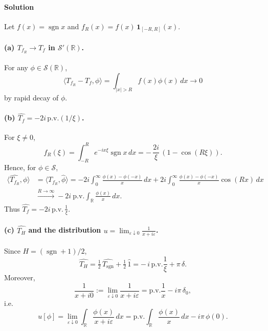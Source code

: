 \documentclass[12pt,a4paper]{article}
\theoremstyle{plain}
\theoremstyle{definition}
\theoremstyle{remark}
\theoremstyle{remark}
\begin{document}
\paragraph*{Solution}

Let $f(x)=\operatorname{sgn}x$ and $f_R(x)=f(x)\,\mathbf 1_{[-R,R]}(x)$.

\paragraph{(a) $T_{f_R}\to T_f$ in $\mathcal S'(\mathbb R)$.}
For any $\phi\in\mathcal S(\mathbb R)$,
\[
\langle T_{f_R}-T_f,\phi\rangle
=\int_{|x|>R} f(x)\phi(x)\,dx \longrightarrow 0
\]
by rapid decay of $\phi$.

\smallskip

\paragraph{(b) $\widehat{T_f}=-2i\,\mathrm{p.v.}(1/\xi)$.}
For $\xi\neq0$,
\[
\widehat{f_R}(\xi)=\int_{-R}^R e^{-ix\xi}\operatorname{sgn}x\,dx
=-\,\frac{2i}{\xi}\,(1-\cos(R\xi)).
\]
Hence, for $\phi\in\mathcal S$,
\begin{align*}
	\langle \widehat{T_{f_R}},\phi\rangle
	&=\langle T_{f_R},\widehat\phi\rangle
	= -2i \int_0^\infty \frac{\phi(x)-\phi(-x)}{x}\,dx
	+2i \int_0^\infty \frac{\phi(x)-\phi(-x)}{x}\cos(Rx)\,dx \\
	&\xrightarrow{R\to\infty} -2i\ \mathrm{p.v.}\!\int_{\mathbb R}\frac{\phi(x)}{x}\,dx.
\end{align*}
Thus $\widehat{T_f}=-2i\,\mathrm{p.v.}\,\frac{1}{\xi}$.

\smallskip

\paragraph{(c) $\widehat{T_H}$ and the distribution $u=\lim_{\varepsilon\downarrow0}\frac{1}{x+i\varepsilon}$.}
Since $H=(\operatorname{sgn}+1)/2$,
\[
\widehat{T_H}
=\tfrac12\,\widehat{T_{\operatorname{sgn}}}+\tfrac12\,\widehat{1}
= -\,i\,\mathrm{p.v.}\!\frac{1}{\xi} + \pi\,\delta.
\]
Moreover,
\[
\frac{1}{x+i0}:=\lim_{\varepsilon\downarrow0}\frac{1}{x+i\varepsilon}
= \mathrm{p.v.}\!\frac{1}{x} - i\pi\,\delta_0,
\]
i.e.
\[
u[\phi]=\lim_{\varepsilon\downarrow0}\int_{\mathbb R}\frac{\phi(x)}{x+i\varepsilon}\,dx
= \mathrm{p.v.}\!\int_{\mathbb R}\frac{\phi(x)}{x}\,dx - i\pi\,\phi(0).
\]

\bigskip
\bigskip
\end{document}
